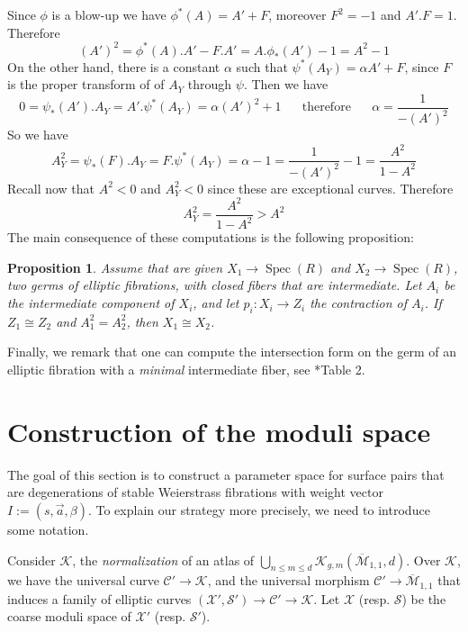 \documentclass[11pt]{amsart}
\newcommand{\sC}{\mathscr{C}}
\newcommand{\sS}{\mathscr{S}}
\newcommand{\sX}{\mathscr{X}}
\newcommand{\spec}{\operatorname{Spec}}
\newcommand{\Kg}{\mathcal{K}}
\newtheorem{Prop}[theorem]{Proposition}
\theoremstyle{definition}
\begin{document}
Since $\phi$ is a blow-up
we have $\phi^*(A)=A'+F$, moreover $F^2=-1$ and $A'.F=1$. Therefore $$(A')^2=\phi^*(A).A' - F.A'=A.\phi_*(A') -1=A^2-1$$
On the other hand, there is a constant $\alpha$ such that $\psi^*(A_Y)=\alpha A' + F$, since $F$ is the proper transform of
of $A_Y$ through $\psi$. Then we have
$$0=\psi_*(A').A_Y=A'.\psi^*(A_Y)=\alpha (A')^2+1 \text{ }\text{ }\text{ therefore }\text{ }\text{ }\alpha=\frac{1}{-(A')^2}$$
So we have $$A_Y^2=\psi_*(F).A_Y=F.\psi^*(A_Y)=\alpha -1=\frac{1}{-(A')^2}-1=\frac{A^2}{1-A^2}$$
Recall now that $A^2<0$ and $A_Y^2<0$ since these are exceptional curves. Therefore
$$A_Y^2=\frac{A^2}{1-A^2}>A^2$$
The main consequence of these computations is the following proposition:
\begin{Prop}\label{Prop:recognize:the:intermediate:from:int:pairing}
 Assume that are given $X_1 \to \spec(R)$ and $X_2 \to \spec(R)$, two germs of elliptic fibrations, with closed fibers that are intermediate. Let
 $A_i$ be the intermediate component of $X_i$, and let
 $p_i:X_i \to Z_i$ the contraction of $A_i$. If $Z_1 \cong Z_2$ and $A_1^2=A_2^2$, then $X_1 \cong X_2$.
\end{Prop}
Finally, we remark that one can compute the intersection form on the germ of an elliptic fibration with a \emph{minimal} intermediate fiber, see \cite{AB3}*{Table 2}. 
\section{Construction of the moduli space}\label{Section:construction:of:the:moduli:surface:pairs}
The goal of this section is to construct a parameter space for surface pairs that are degenerations of
stable Weierstrass fibrations with weight vector $I:=(s,\vec{a},\beta)$.
To explain our strategy more precisely, we need to introduce some notation.

Consider $\Kg$, the \emph{normalization} of an atlas of $\bigcup_{n \le m \le d}\mathcal{K}_{g,m}(\overline{\mathcal{M}}_{1,1},d)$.
Over $\Kg$, we have the universal curve $\sC' \to \Kg$, and the universal morphism $\sC'\to \overline{\mathcal{M}}_{1,1}$ that induces a
family of elliptic curves
$(\sX',\sS') \to \sC' \to \Kg$.
Let $\sX$ (resp. $\sS$) be the coarse moduli space of $\sX'$ (resp. $\sS'$).
 
\end{document}
